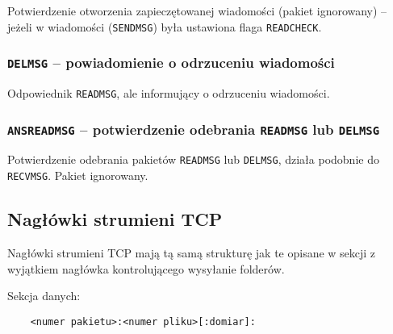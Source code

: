 \documentclass[11pt,leqno]{article}
\begin{document}
Potwierdzenie otworzenia zapieczętowanej wiadomości (pakiet ignorowany) -- jeżeli 
w wiadomości (\texttt{SENDMSG}) była ustawiona flaga \texttt{READCHECK}.


\subsubsection{\textnormal{\texttt{DELMSG}} -- powiadomienie o odrzuceniu wiadomości}

Odpowiednik \texttt{READMSG}, ale informujący o odrzuceniu wiadomości.


\subsubsection{\textnormal{\texttt{ANSREADMSG}} -- potwierdzenie odebrania \textnormal{\texttt{READMSG}} lub \textnormal{\texttt{DELMSG}}}

Potwierdzenie odebrania pakietów \texttt{READMSG} lub \texttt{DELMSG}, działa podobnie do
\texttt{RECVMSG}. Pakiet ignorowany.




\subsection{Nagłówki strumieni TCP}\label{sec:tcpHeaders}

Nagłówki strumieni TCP mają tą samą strukturę jak te opisane w sekcji  z
wyjątkiem nagłówka kontrolującego wysyłanie folderów.

Sekcja danych:

\begin{verbatim}
	<numer pakietu>:<numer pliku>[:domiar]:
\end{verbatim}
\end{document}
